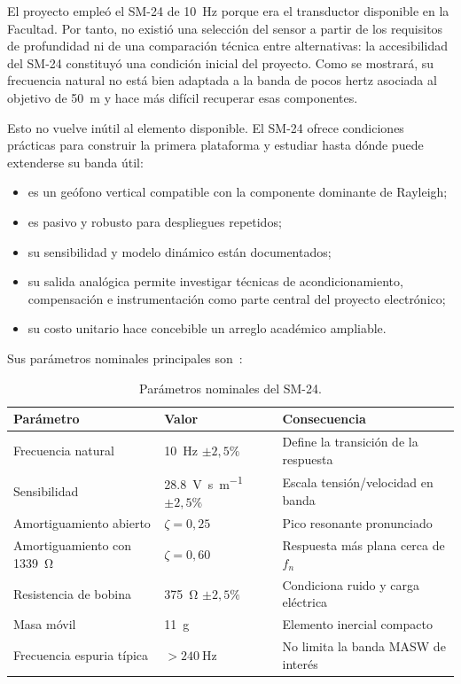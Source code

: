 El proyecto empleó el SM-24 de \SI{10}{\hertz} porque era el transductor disponible en
la Facultad. Por tanto, no existió una selección del sensor a partir de los requisitos de
profundidad ni de una comparación técnica entre alternativas: la accesibilidad del
SM-24 constituyó una condición inicial del proyecto. Como se mostrará, su frecuencia
natural no está bien adaptada a la banda de pocos hertz asociada al objetivo de
\SI{50}{\meter} y hace más difícil recuperar esas componentes.

Esto no vuelve inútil al elemento disponible. El SM-24 ofrece condiciones prácticas para
construir la primera plataforma y estudiar hasta dónde puede extenderse su banda útil:

\begin{itemize}
    \item es un geófono vertical compatible con la componente dominante de Rayleigh;
    \item es pasivo y robusto para despliegues repetidos;
    \item su sensibilidad y modelo dinámico están documentados;
    \item su salida analógica permite investigar técnicas de acondicionamiento,
    compensación e instrumentación como parte central del proyecto electrónico;
    \item su costo unitario hace concebible un arreglo académico ampliable.
\end{itemize}

Sus parámetros nominales principales son~\cite{SM24}:

\begin{table}[ht]
\centering
\small
\caption{Parámetros nominales del SM-24.}
\begin{tabular}{@{}lll@{}}
\toprule
\textbf{Parámetro} & \textbf{Valor} & \textbf{Consecuencia} \\
\midrule
Frecuencia natural & \SI{10}{\hertz} $\pm2{,}5\%$ & Define la transición de la respuesta \\
Sensibilidad & \SI{28.8}{\volt\second\per\meter} $\pm2{,}5\%$ & Escala tensión/velocidad en banda \\
Amortiguamiento abierto & $\zeta=0{,}25$ & Pico resonante pronunciado \\
Amortiguamiento con \SI{1339}{\ohm} & $\zeta=0{,}60$ & Respuesta más plana cerca de $f_n$ \\
Resistencia de bobina & \SI{375}{\ohm} $\pm2{,}5\%$ & Condiciona ruido y carga eléctrica \\
Masa móvil & \SI{11}{\gram} & Elemento inercial compacto \\
Frecuencia espuria típica & $>\SI{240}{\hertz}$ & No limita la banda MASW de interés \\
\bottomrule
\end{tabular}
\end{table}

